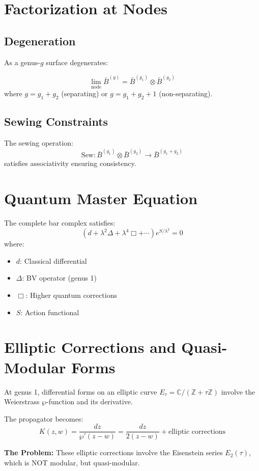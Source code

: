 \section{Factorization at Nodes}

\subsection{Degeneration}

As a genus-$g$ surface degenerates:

\begin{theorem}[Factorization]
$$\lim_{\text{node}} \bar{B}^{(g)} = \bar{B}^{(g_1)} \otimes \bar{B}^{(g_2)}$$
where $g = g_1 + g_2$ (separating) or $g = g_1 + g_2 + 1$ (non-separating).
\end{theorem}

\subsection{Sewing Constraints}

The sewing operation:
$$\text{Sew}: \bar{B}^{(g_1)} \otimes \bar{B}^{(g_2)} \to \bar{B}^{(g_1+g_2)}$$
satisfies associativity ensuring consistency.

\section{Quantum Master Equation}

\begin{theorem}
The complete bar complex satisfies:
$$(d + \lambda^2\Delta + \lambda^4\Box + \cdots)e^{S/\lambda^2} = 0$$
where:
\begin{itemize}
\item $d$: Classical differential
\item $\Delta$: BV operator (genus 1)
\item $\Box$: Higher quantum corrections
\item $S$: Action functional
\end{itemize}
\end{theorem}

\section{Elliptic Corrections and Quasi-Modular Forms}
\label{sec:elliptic-quasimodular}

\begin{remark}\label{rem:E2-anomaly}
At genus 1, differential forms on an elliptic curve $E_\tau = \mathbb{C}/(\mathbb{Z} + \tau\mathbb{Z})$ 
involve the Weierstrass $\wp$-function and its derivative.

The propagator becomes:
$$K(z,w) = \frac{dz}{\wp'(z-w)} = \frac{dz}{2(z-w)} + \text{elliptic corrections}$$

\textbf{The Problem:} These elliptic corrections involve the Eisenstein series $E_2(\tau)$, 
which is NOT modular, but quasi-modular.
\end{remark}

